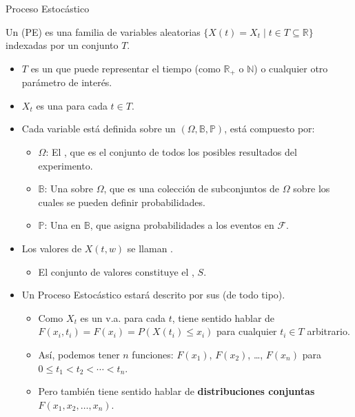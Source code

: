\documentclass[10pt, envcountsect, handout, aspectratio=1610, hyperref={hypertexnames=true}]{beamer}
\begin{document}
\begin{frame}{Proceso Estocástico}

\begin{definition}
Un  (PE) es una familia de variables aleatorias \(\{X(t)=X_t \mid t \in T\subseteq\mathbb{R} \}\) indexadas por un conjunto \(T\). 
\end{definition}

\begin{itemize}
\item \(T\) es un  que puede representar el tiempo (como \(\mathbb{R}_+\) o \(\mathbb{N}\)) o cualquier otro parámetro de interés.
\item \(X_t\) es una  para cada \(t \in T\).
\item Cada variable está definida sobre un  \((\Omega, \mathbb{B}, \mathbb{P})\), está compuesto por:
\begin{itemize}
    \item \(\Omega\): El , que es el conjunto de todos los posibles resultados del experimento.
    \item \(\mathbb{B}\): Una  sobre \(\Omega\), que es una colección de subconjuntos de \(\Omega\) sobre los cuales se pueden definir probabilidades.
    \item \(\mathbb{P}\): Una  en \(\mathbb{B}\), que asigna probabilidades a los eventos en \(\mathcal{F}\).
\end{itemize}  

\item Los valores de $X(t, w)$ se llaman .
	\begin{itemize}
    \item El conjunto de valores constituye el , $S$.
    \end{itemize}
    

\item Un Proceso Estocástico estará descrito por sus  (de todo tipo). 

\begin{itemize}
\item Como $X_t$ es un v.a. para cada $t$, tiene sentido hablar de $F(x_i, t_i) = F(x_i) = P(X(t_i)\leq x_i)$ para cualquier  $t_i\in T$ arbitrario.
\item Así, podemos tener $n$ funciones: $F(x_1)$, $F(x_2)$, \ldots, $F(x_n)$ para $0\leq t_1 < t_2 < \cdots < t_n$.

\item Pero también tiene sentido hablar de \textbf{distribuciones conjuntas} $F(x_1, x_2, \ldots, x_n)$.

\end{itemize}

\end{itemize}
\end{frame}
\end{document}
